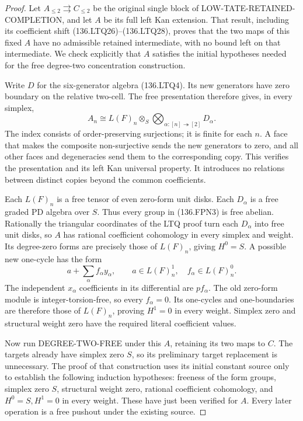 \begin{proof}
Let \(A_{\leq2}\rightrightarrows C_{\leq2}\) be the original
single block of LOW-TATE-RETAINED-COMPLETION, and let \(A\)
be its full left Kan extension. That result, including its
coefficient shift (136.LTQ26)--(136.LTQ28), proves that the
two maps of this fixed \(A\) have no admissible retained
intermediate, with no bound left on that intermediate.
We check explicitly that \(A\) satisfies the initial hypotheses
needed for the free degree-two concentration construction.

Write \(D\) for the six-generator algebra (136.LTQ4).
Its new generators have zero boundary on the relative two-cell.
The free presentation therefore gives, in every simplex,
\[
 A_n\cong L(F)_n\otimes_S
          \bigotimes_{\alpha:[n]\twoheadrightarrow[2]}D_\alpha.
                                                        \tag{136.FPN3}
\]
The index consists of order-preserving surjections; it is finite
for each \(n\). A face that makes the composite non-surjective
sends the new generators to zero, and all other faces and
degeneracies send them to the corresponding copy. This verifies
the presentation and its left Kan universal property. It introduces
no relations between distinct copies beyond the common coefficients.

Each \(L(F)_n\) is a free tensor of even zero-form unit disks.
Each \(D_\alpha\) is a free graded PD algebra over \(S\).
Thus every group in (136.FPN3) is free abelian. Rationally
the triangular coordinates of the LTQ proof turn each \(D_\alpha\)
into free unit disks, so \(A\) has rational coefficient cohomology
in every simplex and weight. Its degree-zero forms are precisely
those of \(L(F)_n\), giving \(H^0=S\). A possible new one-cycle
has the form
\[
                  a+\sum_\alpha f_\alpha y_\alpha,
       \qquad a\in L(F)_n^1,\quad f_\alpha\in L(F)_n^0.
\]
The independent \(x_\alpha\) coefficients in its differential
are \(p f_\alpha\). The old zero-form module is integer-torsion-free,
so every \(f_\alpha=0\). Its one-cycles and one-boundaries are
therefore those of \(L(F)_n\), proving \(H^1=0\) in every
weight. Simplex zero and structural weight zero have the required
literal coefficient values.

Now run DEGREE-TWO-FREE under this \(A\), retaining its two
maps to \(C\). The targets already have simplex zero \(S\),
so its preliminary target replacement is unnecessary.
The proof of that construction uses its initial constant source
only to establish the following induction hypotheses: freeness of
the form groups, simplex zero \(S\), structural weight zero,
rational coefficient cohomology, and \(H^0=S,H^1=0\) in
every weight. These have just been verified for \(A\).
Every later operation is a free pushout under the existing source.


\end{proof}
